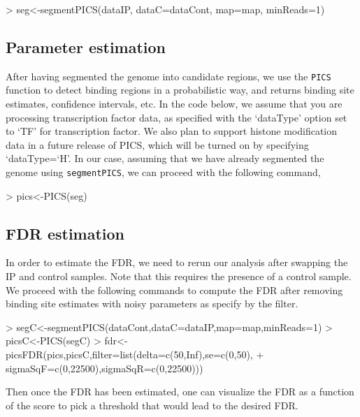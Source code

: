 \documentclass[a4paper]{article}
\begin{document}
\begin{Schunk}
\begin{Sinput}
> seg<-segmentPICS(dataIP, dataC=dataCont, map=map, minReads=1)
\end{Sinput}
\end{Schunk}


\subsection{Parameter estimation}
After having segmented the genome into candidate regions, we use the \texttt{PICS} function to detect binding regions in a probabilistic way, and returns binding site estimates, confidence intervals, etc. In the code below, we assume that you are processing transcription factor data, as specified with the `dataType' option set to `TF' for transcription factor. We also plan to support histone modification data in a future release of PICS, which will be turned on by specifying `dataType=`H'. In our case, assuming that we have already segmented the genome using \texttt{segmentPICS}, we can proceed with the following command, 

\begin{Schunk}
\begin{Sinput}
> pics<-PICS(seg)
\end{Sinput}
\end{Schunk}

\subsection{FDR estimation}
In order to estimate the FDR, we need to rerun our analysis after swapping the IP and control samples. Note that this requires the presence of a control sample. We proceed with the following commands to compute the FDR after removing binding site estimates with noisy parameters as specify by the filter. 

\begin{Schunk}
\begin{Sinput}
> segC<-segmentPICS(dataCont,dataC=dataIP,map=map,minReads=1)
> picsC<-PICS(segC)
> fdr<-picsFDR(pics,picsC,filter=list(delta=c(50,Inf),se=c(0,50),
+ sigmaSqF=c(0,22500),sigmaSqR=c(0,22500)))
\end{Sinput}
\end{Schunk}

Then once the FDR has been estimated, one can visualize the FDR as a function of the score to pick a threshold that would lead to the desired FDR. 
\end{document}
